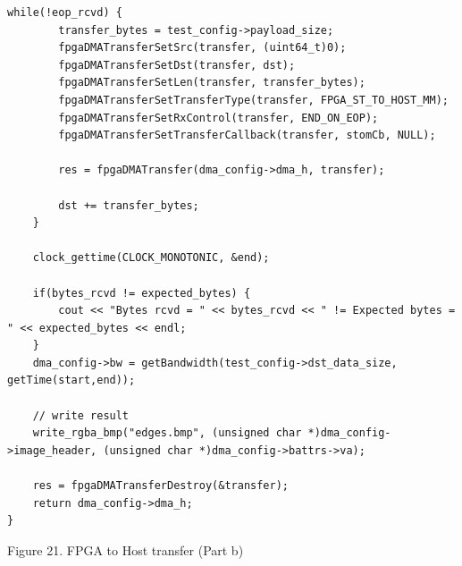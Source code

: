\documentclass[11pt, twoside, pdftex]{article}
\begin{document}
\lstset{language=C,numbers=left,escapechar=\#}
\begin{center}
\begin{minipage}[h]{17.5 cm}
\begin{lstlisting}[name=s2mworker]
	while(!eop_rcvd) {
		transfer_bytes = test_config->payload_size;
		fpgaDMATransferSetSrc(transfer, (uint64_t)0);
		fpgaDMATransferSetDst(transfer, dst);
		fpgaDMATransferSetLen(transfer, transfer_bytes);
		fpgaDMATransferSetTransferType(transfer, FPGA_ST_TO_HOST_MM);
		fpgaDMATransferSetRxControl(transfer, END_ON_EOP);
		fpgaDMATransferSetTransferCallback(transfer, stomCb, NULL);

		res = fpgaDMATransfer(dma_config->dma_h, transfer);

		dst += transfer_bytes;
	}

	clock_gettime(CLOCK_MONOTONIC, &end);

	if(bytes_rcvd != expected_bytes) {
		cout << "Bytes rcvd = " << bytes_rcvd << " != Expected bytes = " << expected_bytes << endl;
	}
	dma_config->bw = getBandwidth(test_config->dst_data_size, getTime(start,end));

	// write result
	write_rgba_bmp("edges.bmp", (unsigned char *)dma_config->image_header, (unsigned char *)dma_config->battrs->va);

	res = fpgaDMATransferDestroy(&transfer);
	return dma_config->dma_h;
}

\end{lstlisting}
\end{minipage}
Figure 21. FPGA to Host transfer (Part b)
\label{fig:s2mworker}
\end{center}
\end{document}
